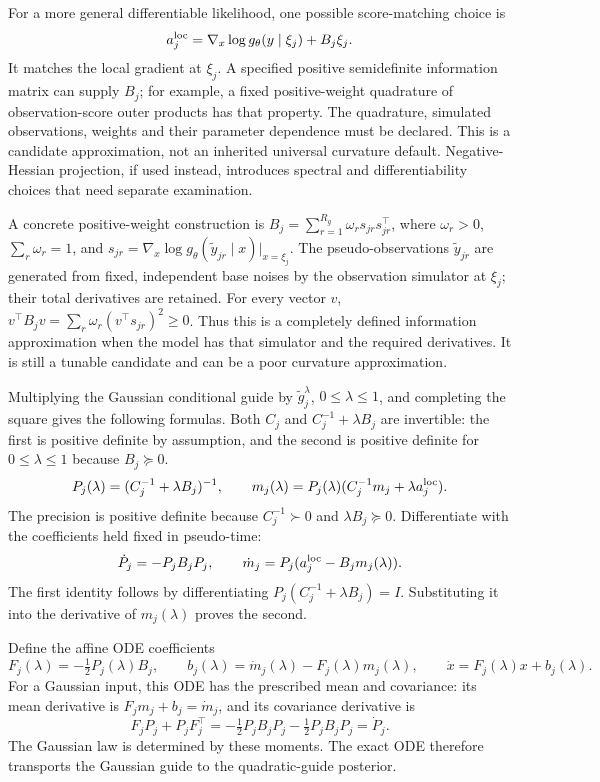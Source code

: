 \documentclass[11pt,a4paper]{article}
\begin{document}
For a more general differentiable likelihood, one possible score-matching
choice is
\[
 a_j^{\rm loc}
 =\nabla_x\log g_\theta(y\mid \xi_j)+B_j\xi_j .
\]
It matches the local gradient at \(\xi_j\). A specified positive
semidefinite information matrix can supply \(B_j\); for example, a fixed
positive-weight quadrature of observation-score outer products has that
property. The quadrature, simulated observations, weights and their
parameter dependence must be declared. This is a candidate approximation,
not an inherited universal curvature default. Negative-Hessian projection,
if used instead, introduces spectral and differentiability choices that
need separate examination.

A concrete positive-weight construction is
\(B_j=\sum_{r=1}^{R_g}\omega_r s_{jr}s_{jr}^\top\),
where \(\omega_r>0\), \(\sum_r\omega_r=1\), and
\(s_{jr}=\nabla_x\log g_\theta(\widetilde y_{jr}\mid x)|_{x=\xi_j}\).
The pseudo-observations \(\widetilde y_{jr}\) are generated from fixed,
independent base noises by the observation simulator at \(\xi_j\);
their total derivatives are retained. For every vector \(v\),
\(v^\top B_jv=\sum_r\omega_r(v^\top s_{jr})^2\geq0\).
Thus this is a completely defined information approximation when the
model has that simulator and the required derivatives. It is still a
tunable candidate and can be a poor curvature approximation.

Multiplying the Gaussian conditional guide by
\(\widetilde g_j^\lambda\), \(0\leq\lambda\leq1\), and completing the
square gives the following formulas. Both \(C_j\) and
\(C_j^{-1}+\lambda B_j\) are invertible: the first is positive definite
by assumption, and the second is positive definite for
\(0\leq\lambda\leq1\) because \(B_j\succeq0\).
\begin{equation}
\label{eq:bridge-moments}
 P_j(\lambda)=(C_j^{-1}+\lambda B_j)^{-1},\qquad
 m_j(\lambda)=P_j(\lambda)
       (C_j^{-1}m_j+\lambda a_j^{\rm loc}).
\end{equation}
The precision is positive definite because \(C_j^{-1}\succ0\) and
\(\lambda B_j\succeq0\). Differentiate with the coefficients held fixed
in pseudo-time:
\begin{equation}
\label{eq:bridge-derivatives}
 \dot P_j=-P_jB_jP_j,\qquad
 \dot m_j=P_j(a_j^{\rm loc}-B_jm_j(\lambda)).
\end{equation}
The first identity follows by differentiating
\(P_j(C_j^{-1}+\lambda B_j)=I\). Substituting it into the derivative
of \(m_j(\lambda)\) proves the second.

Define the affine ODE coefficients
\begin{equation}
\label{eq:local-ode}
 F_j(\lambda)=-\tfrac12P_j(\lambda)B_j,\qquad
 b_j(\lambda)=\dot m_j(\lambda)-F_j(\lambda)m_j(\lambda),
 \qquad \dot x=F_j(\lambda)x+b_j(\lambda).
\end{equation}
For a Gaussian input, this ODE has the prescribed mean and covariance:
its mean derivative is \(F_jm_j+b_j=\dot m_j\), and its covariance
derivative is
\[
 F_jP_j+P_jF_j^\top
 =-\tfrac12P_jB_jP_j-\tfrac12P_jB_jP_j
 =\dot P_j .
\]
The Gaussian law is determined by these moments. The exact ODE therefore
transports the Gaussian guide to the quadratic-guide posterior.
\end{document}
